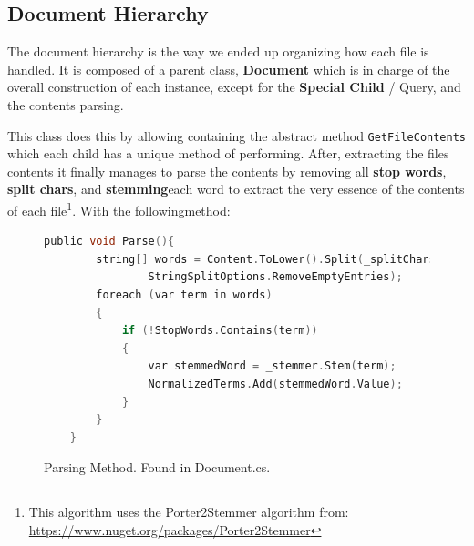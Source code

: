 \documentclass{article}
\begin{document}
\subsection{Document Hierarchy}
The document hierarchy is the way we ended up organizing how each file is handled. It is composed of a parent class, \textbf{Document} which is in charge of the overall construction of each instance, except for the \textbf{Special Child} / Query, and the contents parsing. 

This class does this by allowing containing the abstract method \texttt{GetFileContents} which each child has a unique method of performing. After, extracting the files contents it finally manages to parse the contents by removing all \textbf{stop words}, \textbf{split chars}, and \textbf{stemming}each word to extract the very essence of the contents of each file\footnote{This algorithm uses the Porter2Stemmer algorithm from: \url{https://www.nuget.org/packages/Porter2Stemmer}}. With the followingmethod:
\begin{figure}[H]
    \begin{lstlisting}[language=C]
    public void Parse(){    
        string[] words = Content.ToLower().Split(_splitChars,
                StringSplitOptions.RemoveEmptyEntries);
        foreach (var term in words) 
        {
            if (!StopWords.Contains(term))
            {
                var stemmedWord = _stemmer.Stem(term);
                NormalizedTerms.Add(stemmedWord.Value);
            }
        }
    }
    \end{lstlisting}
    \caption{Parsing Method. Found in Document.cs.}
    \label{fig:ParseMethod}
\end{figure}
\end{document}

